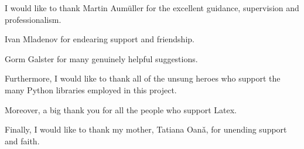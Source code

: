 \begin{acknowledgements}

I would like to thank Martin Aum\"{u}ller for the excellent guidance, supervision and professionalism. 

Ivan Mladenov for endearing support and friendship.

Gorm Galster for many genuinely helpful suggestions. 

Furthermore, I would like to thank all of the unsung heroes who support the many Python libraries employed in this project.

Moreover, a big thank you for all the people who support Latex.

Finally, I would like to thank my mother, Tatiana Oan\v{a}, for unending support and faith.

\end{acknowledgements}



